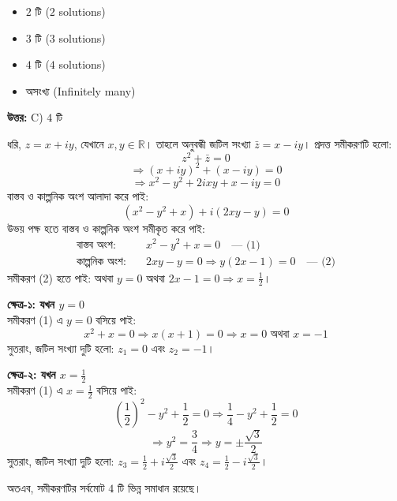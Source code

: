 \documentclass[12pt, a4paper]{article}
\begin{document}
\begin{itemize}[label={}, leftmargin=1cm, itemsep=0.5em]
    \item[\textbf{A)}] $2$ টি ($2$ solutions)
    \item[\textbf{B)}] $3$ টি ($3$ solutions)
    \item[\textbf{C)}] $4$ টি ($4$ solutions)
    \item[\textbf{D)}] অসংখ্য (Infinitely many)
\end{itemize}

\vspace{0.5em}
\begin{tcolorbox}[answerbox]
    \textbf{\color{success} উত্তর:} C) $4$ টি
\end{tcolorbox}
\vspace{1em}

\begin{tcolorbox}[solutionbox={সমাধান (Solution)}]
    \noindent
    ধরি, $z = x + iy$, যেখানে $x, y \in \mathbb{R}$। তাহলে অনুবন্ধী জটিল সংখ্যা $\bar{z} = x - iy$। প্রদত্ত সমীকরণটি হলো:
    \[ z^2 + \bar{z} = 0 \]
    \[ \Rightarrow (x + iy)^2 + (x - iy) = 0 \]
    \[ \Rightarrow x^2 - y^2 + 2ixy + x - iy = 0 \]
    বাস্তব ও কাল্পনিক অংশ আলাদা করে পাই:
    \[ (x^2 - y^2 + x) + i(2xy - y) = 0 \]
    উভয় পক্ষ হতে বাস্তব ও কাল্পনিক অংশ সমীকৃত করে পাই:
    \begin{align*}
        \text{বাস্তব অংশ:} &\quad x^2 - y^2 + x = 0 \quad \text{--- (1)} \\
        \text{কাল্পনিক অংশ:} &\quad 2xy - y = 0 \Rightarrow y(2x - 1) = 0 \quad \text{--- (2)}
    \end{align*}
    সমীকরণ (2) হতে পাই: অথবা $y = 0$ অথবা $2x - 1 = 0 \Rightarrow x = \frac{1}{2}$।
    
    \vspace{0.5em}
    \textbf{ক্ষেত্র-১: যখন $y = 0$} \\
    সমীকরণ (1) এ $y = 0$ বসিয়ে পাই:
    \[ x^2 + x = 0 \Rightarrow x(x + 1) = 0 \Rightarrow x = 0 \text{ অথবা } x = -1 \]
    সুতরাং, জটিল সংখ্যা দুটি হলো: $z_1 = 0$ এবং $z_2 = -1$।
    
    \vspace{0.5em}
    \textbf{ক্ষেত্র-২: যখন $x = \frac{1}{2}$} \\
    সমীকরণ (1) এ $x = \frac{1}{2}$ বসিয়ে পাই:
    \[ \left(\frac{1}{2}\right)^2 - y^2 + \frac{1}{2} = 0 \Rightarrow \frac{1}{4} - y^2 + \frac{1}{2} = 0 \]
    \[ \Rightarrow y^2 = \frac{3}{4} \Rightarrow y = \pm \frac{\sqrt{3}}{2} \]
    সুতরাং, জটিল সংখ্যা দুটি হলো: $z_3 = \frac{1}{2} + i\frac{\sqrt{3}}{2}$ এবং $z_4 = \frac{1}{2} - i\frac{\sqrt{3}}{2}$।
    
    \vspace{0.5em}
    অতএব, সমীকরণটির সর্বমোট $4$ টি ভিন্ন সমাধান রয়েছে।
\end{tcolorbox}
\vspace{1em}
\end{document}
